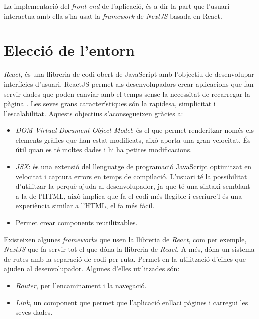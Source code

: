 La implementació del \emph{front-end} de l'aplicació, és a dir
la part que l'usuari interactua amb ella s'ha usat la \emph{framework} de \emph{NextJS}
\autocite{nextjs} basada en React.

\section{Elecció de l'entorn}

\emph{React}, és una llibreria de codi obert de JavaScript amb l'objectiu de desenvolupar interfícies d'usuari.
ReactJS permet als desenvolupadors crear aplicacions que fan servir dades que poden canviar
amb el temps sense la necessitat de recarregar la pàgina \autocite{react}. Les seves grans característiques
són la rapidesa, simplicitat i l'escalabilitat. Aquests objectius s'aconsegueixen gràcies a:

\begin{itemize}
    \item \emph{DOM Virtual} \emph{Document Object Model}: és el que permet renderitzar només
    els elements gràfics que han estat modificats, això aporta una gran velocitat. És
    útil quan es té moltes dades i hi ha petites modificacions.
    \item \emph{JSX}: és una extensió del llenguatge de programació JavaScript optimitzat
    en velocitat i captura errors en temps de compilació. L'usuari té la possibilitat
    d'utilitzar-la perquè ajuda al desenvolupador, ja que té una sintaxi semblant a la de
    l'HTML, això implica que fa el codi més llegible i escriure'l és una experiència
    similar a l'HTML, el fa més fàcil.
    \item Permet crear components reutilitzables.
\end{itemize}

Existeixen algunes \emph{frameworks} que usen la llibreria de \emph{React}, com per exemple,
\emph{NextJS} que fa servir tot el que dóna la llibreria de \emph{React}. A més, dóna un sistema
de rutes amb la separació de codi per ruta. Permet en la utilització d'eines que ajuden al
desenvolupador. Algunes d'elles utilitzades són:

\begin{itemize}
    \item \emph{Router}, per l'encaminament i la navegació.
    \item \emph{Link}, un component que permet que l'aplicació enllaci pàgines i carregui les
    seves dades.
\end{itemize}


